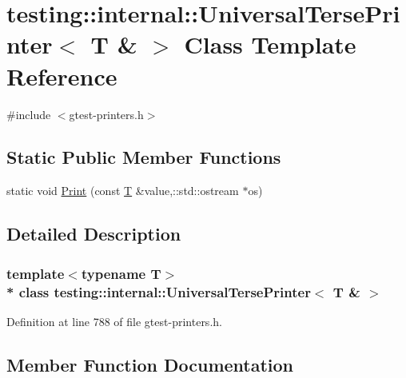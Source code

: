 \hypertarget{classtesting_1_1internal_1_1_universal_terse_printer_3_01_t_01_6_01_4}{}\section{testing\+:\+:internal\+:\+:Universal\+Terse\+Printer$<$ T \& $>$ Class Template Reference}
\label{classtesting_1_1internal_1_1_universal_terse_printer_3_01_t_01_6_01_4}


{\ttfamily \#include $<$gtest-\/printers.\+h$>$}

\subsection*{Static Public Member Functions}
\begin{DoxyCompactItemize}
\item 
static void \hyperlink{classtesting_1_1internal_1_1_universal_terse_printer_3_01_t_01_6_01_4_a5f0d2e50bb18c00d019389fca869b9d0}{Print} (const \hyperlink{functions__7_8js_adf1f3edb9115acb0a1e04209b7a9937b}{T} \&value,\+::std\+::ostream $\ast$os)
\end{DoxyCompactItemize}


\subsection{Detailed Description}
\subsubsection*{template$<$typename T$>$\\*
class testing\+::internal\+::\+Universal\+Terse\+Printer$<$ T \& $>$}



Definition at line 788 of file gtest-\/printers.\+h.



\subsection{Member Function Documentation}
